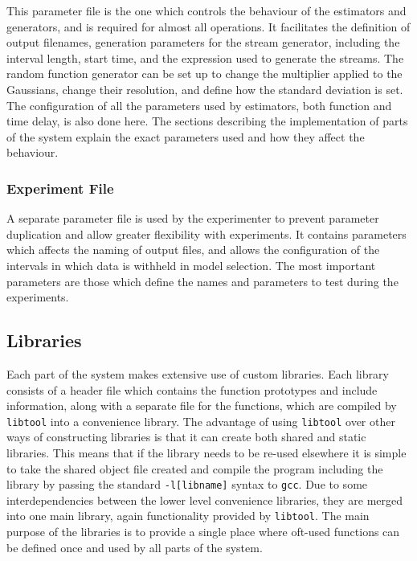 \documentclass[a4paper,11pt]{article}
\begin{document}
    This parameter file is the one which controls the behaviour of the
    estimators and generators, and is required for almost all operations. It
    facilitates the definition of output filenames, generation parameters for
    the stream generator, including the interval length, start time, and the
    expression used to generate the streams. The random function generator can
    be set up to change the multiplier applied to the Gaussians, change their
    resolution, and define how the standard deviation is set. The configuration
    of all the parameters used by estimators, both function and time delay, is
    also done here. The sections describing the implementation of parts of the
    system explain the exact parameters used and how they affect the behaviour.
\subsubsection{Experiment File}
\label{sec-6-2-2}

    A separate parameter file is used by the experimenter to prevent parameter
    duplication and allow greater flexibility with experiments. It contains
    parameters which affects the naming of output files, and allows the
    configuration of the intervals in which data is withheld in model
    selection. The most important parameters are those which define the names
    and parameters to test during the experiments.
\subsection{Libraries}
\label{sec-6-3}

   Each part of the system makes extensive use of custom libraries. Each library
   consists of a header file which contains the function prototypes and include
   information, along with a separate file for the functions, which are compiled
   by \texttt{libtool} into a convenience library. The advantage of using
   \texttt{libtool} over other ways of constructing libraries is that it can
   create both shared and static libraries. This means that if the library needs
   to be re-used elsewhere it is simple to take the shared object file created
   and compile the program including the library by passing the standard
   \texttt{-l[libname]} syntax to \texttt{gcc}. Due to some interdependencies
   between the lower level convenience libraries, they are merged into one main
   library, again functionality provided by \texttt{libtool}. The main purpose
   of the libraries is to provide a single place where oft-used functions can be
   defined once and used by all parts of the system.
\end{document}
